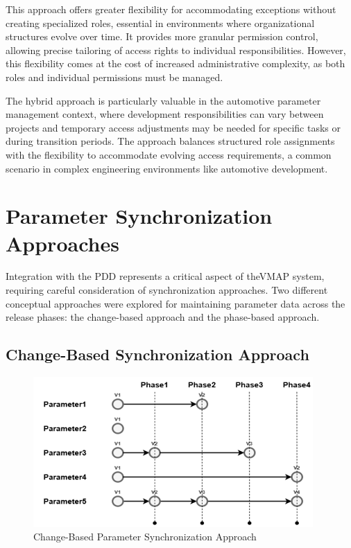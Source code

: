 This approach offers greater flexibility for accommodating exceptions without creating specialized roles, essential in environments where organizational structures evolve over time. It provides more granular permission control, allowing precise tailoring of access rights to individual responsibilities. However, this flexibility comes at the cost of increased administrative complexity, as both roles and individual permissions must be managed.

The hybrid approach is particularly valuable in the automotive parameter management context, where development responsibilities can vary between projects and temporary access adjustments may be needed for specific tasks or during transition periods. The approach balances structured role assignments with the flexibility to accommodate evolving access requirements, a common scenario in complex engineering environments like automotive development.

\section{Parameter Synchronization Approaches}
\label{sec:parameter-sync-approaches}

Integration with the \ac{PDD} represents a critical aspect of the\ac{VMAP} system, requiring careful consideration of synchronization approaches. Two different conceptual approaches were explored for maintaining parameter data across the release phases: the change-based approach and the phase-based approach.

\subsection{Change-Based Synchronization Approach}
\label{subsec:change-based-sync}

\begin{figure}[h]
    \centering
    \includegraphics[width=0.95\textwidth]{figures/change_based_approach.png}
    \caption{Change-Based Parameter Synchronization Approach}
    \label{fig:change-based-sync}
\end{figure}

